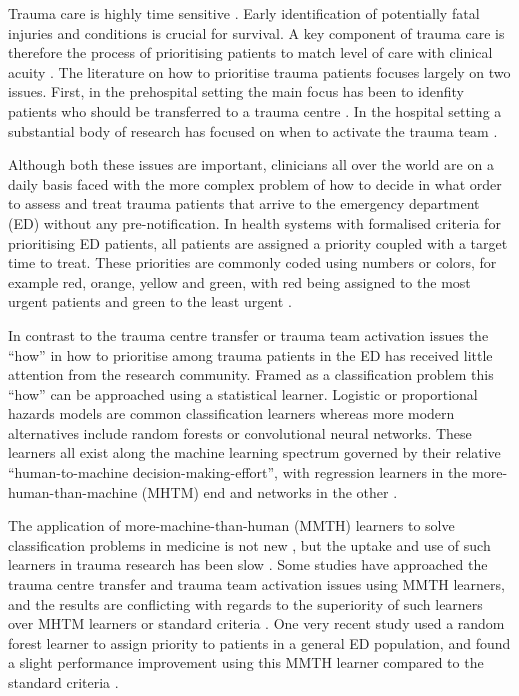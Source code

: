 \documentclass[10pt,letterpaper]{article}\usepackage[]{graphicx}\usepackage[]{color}
\begin{document}
Trauma care is highly time sensitive \cite{Fitzgerald2011}. Early identification
of potentially fatal injuries and conditions is crucial for survival. A key
component of trauma care is therefore the process of prioritising patients to
match level of care with clinical acuity \cite{EAST2010,NICE2016}. The
literature on how to prioritise trauma patients focuses largely on two
issues. First, in the prehospital setting the main focus has been to idenfity
patients who should be transferred to a trauma centre \cite{Voskens2018}. In the
hospital setting a substantial body of research has focused on when to activate
the trauma team \cite{VanRein2018,Tignanelli2018}.

Although both these issues are important, clinicians all over the world are on a
daily basis faced with the more complex problem of how to decide in what order
to assess and treat trauma patients that arrive to the emergency department (ED)
without any pre-notification. In health systems with formalised criteria for
prioritising ED patients, all patients are assigned a priority coupled with a
target time to treat. These priorities are commonly coded using numbers or
colors, for example red, orange, yellow and green, with red being assigned to
the most urgent patients and green to the least urgent \cite{SATG2012}.

In contrast to the trauma centre transfer or trauma team activation issues the
``how'' in how to prioritise among trauma patients in the ED has received little
attention from the research community. Framed as a classification problem this
``how'' can be approached using a statistical learner. Logistic or proportional
hazards models are common classification learners whereas more modern
alternatives include random forests or convolutional neural networks. These
learners all exist along the machine learning spectrum governed by their
relative ``human-to-machine decision-making-effort'', with regression learners
in the more-human-than-machine (MHTM) end and networks in the other
\cite{Beam2018}.

The application of more-machine-than-human (MMTH) learners to solve
classification problems in medicine is not new \cite{Nevin2018}, but the uptake
and use of such learners in trauma research has been slow \cite{Liu2017}. Some
studies have approached the trauma centre transfer and trauma team activation
issues using MMTH learners, and the results are conflicting with regards to the
superiority of such learners over MHTM learners or standard criteria
\cite{Talbert2007,Pearl2008,Scerbo2014,Follin2016}. One very recent study used a
random forest learner to assign priority to patients in a general ED population,
and found a slight performance improvement using this MMTH learner compared to
the standard criteria \cite{Levin2018}. 
\end{document}
